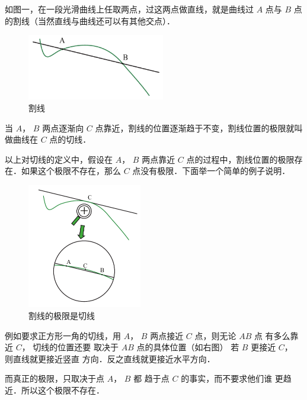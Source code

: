 

如图一，在一段光滑曲线上任取两点，过这两点做直线，就是曲线过 $A$ 点与 $B$ 点的割线（当然直线与曲线还可以有其他交点）．
\begin{figure}[h]
\centering
\includegraphics[width=6cm]{./figures/TanL1.pdf}
\caption{割线}
\end{figure}
当 $A$，  $B$ 两点逐渐向 $C$ 点靠近，割线的位置逐渐趋于不变，割线位置的极限就叫做曲线在 $C$ 点的切线．

以上对切线的定义中，假设在 $A$，  $B$ 两点靠近 $C$ 点的过程中，割线位置的极限存在．如果这个极限不存在，那么 $C$ 点没有极限．下面举一个简单的例子说明．

\begin{figure}[h]
\vskip 0pt
\centering
\includegraphics[width=5cm]{./figures/TanL2.pdf}
\caption{割线的极限是切线}
\end{figure}
例如要求正方形一角的切线，用
 $A$，  $B$ 两点接近 $C$ 点，则无论 $AB$ 点
有多么靠近 $C$， 切线的位置还要
取决于 $AB$ 点的具体位置（如右图）
若 $B$ 更接近 $C$， 则直线就更接近竖直
方向．反之直线就更接近水平方向．


而真正的极限，只取决于点 $A$，  $B$ 都
趋于点 $C$ 的事实，而不要求他们谁
更趋近．所以这个极限不存在．















